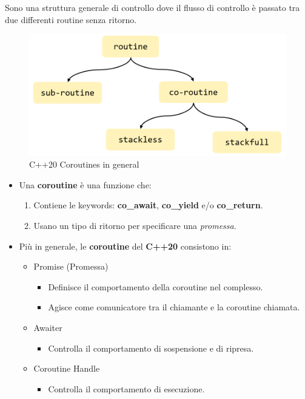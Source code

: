 \textsf{\small Sono una struttura generale di controllo dove il flusso di controllo è passato tra due differenti routine senza ritorno.} \\

\begin{figure}[H]
	\centering
	\includegraphics[width=1\textwidth, height=1\textheight, keepaspectratio]{./imgs/C++20-Coroutine-Under-The-Hood.png}
	\caption{C++20 Coroutines in general}
	\label{fig:coroutines_in_general}
\end{figure}

\begin{itemize}
	\item \textsf{\small Una \textbf{coroutine} è una funzione che: }
	\begin{enumerate}
		\item \textsf{\small Contiene le keywords: \textbf{co\_await}, \textbf{co\_yield} e/o \textbf{co\_return}.}
		\item \textsf{\small Usano un tipo di ritorno per specificare una \emph{promessa}.}
	\end{enumerate}
	\item \textsf{\small Più in generale, le \textbf{coroutine} del \textbf{C++20} consistono in:}
	\begin{itemize}
		\item \textsf{\small Promise (Promessa)}
		\begin{itemize}
			\item \textsf{\small Definisce il comportamento della coroutine nel complesso.}
			\item \textsf{\small Agisce come comunicatore tra il chiamante e la coroutine chiamata.}
		\end{itemize}
		\item \textsf{\small Awaiter}
		\begin{itemize}
			\item \textsf{\small Controlla il comportamento di sospensione e di ripresa.}
		\end{itemize}
		\item \textsf{\small Coroutine Handle}
		\begin{itemize}
			\item \textsf{\small Controlla il comportamento di esecuzione.}
		\end{itemize}
	\end{itemize}
\end{itemize}

